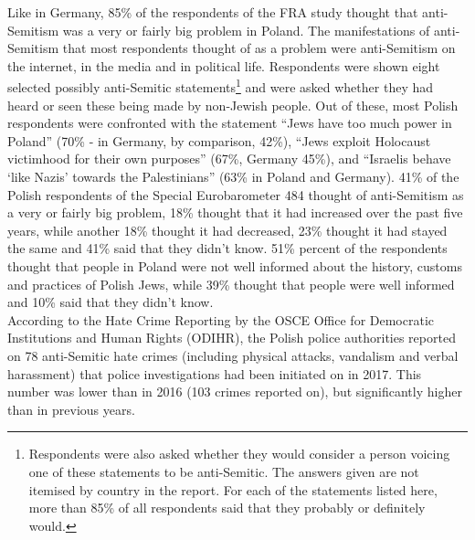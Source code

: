 Like in Germany, 85\% of the respondents of the FRA study thought that anti-Semitism was a very or fairly big problem in Poland. The manifestations of anti-Semitism that most respondents thought of as a problem were anti-Semitism on the internet, in the media and in political life. Respondents were shown eight selected possibly anti-Semitic statements\footnote{Respondents were also asked whether they would consider a person voicing one of these statements to be anti-Semitic. The answers given are not itemised by country in the report. For each of the statements listed here, more than 85\% of all respondents said that they probably or definitely would.} and were asked whether they had heard or seen these being made by non-Jewish people. Out of these, most Polish respondents were confronted with the statement ``Jews have too much power in Poland'' (70\% - in Germany, by comparison, 42\%), ``Jews exploit Holocaust victimhood for their own purposes'' (67\%, Germany 45\%), and ``Israelis behave `like Nazis' towards the Palestinians'' (63\% in Poland and Germany). 41\% of the Polish respondents of the Special Eurobarometer 484 thought of anti-Semitism as a very or fairly big problem, 18\% thought that it had increased over the past five years, while another 18\% thought it had decreased, 23\% thought it had stayed the same and 41\% said that they didn't know. 51\% percent of the respondents thought that people in Poland were not well informed about the history, customs and practices of Polish Jews, while 39\% thought that people were well informed and 10\% said that they didn't know. \\ According to the Hate Crime Reporting by the OSCE Office for Democratic Institutions and Human Rights (ODIHR), the Polish police authorities reported on 78 anti-Semitic hate crimes (including physical attacks, vandalism and verbal harassment) that police investigations had been initiated on in 2017. This number was lower than in 2016 (103 crimes reported on), but significantly higher than in previous years. 
